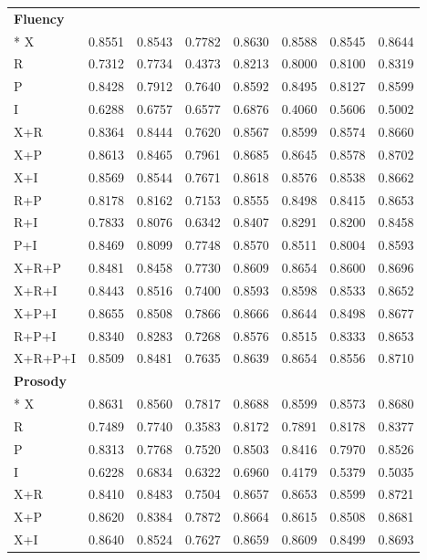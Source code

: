 \documentclass[10pt]{article}
\begin{document}
\begin{longtable}{@{}lrrrrrrr@{}}
\midrule
\multicolumn{8}{l}{\textbf{Fluency}}\\*\midrule
X & 0.8551 & 0.8543 & 0.7782 & 0.8630 & 0.8588 & 0.8545 & 0.8644 \\
R & 0.7312 & 0.7734 & 0.4373 & 0.8213 & 0.8000 & 0.8100 & 0.8319 \\
P & 0.8428 & 0.7912 & 0.7640 & 0.8592 & 0.8495 & 0.8127 & 0.8599 \\
I & 0.6288 & 0.6757 & 0.6577 & 0.6876 & 0.4060 & 0.5606 & 0.5002 \\
X+R & 0.8364 & 0.8444 & 0.7620 & 0.8567 & 0.8599 & 0.8574 & 0.8660 \\
X+P & 0.8613 & 0.8465 & 0.7961 & 0.8685 & 0.8645 & 0.8578 & 0.8702 \\
X+I & 0.8569 & 0.8544 & 0.7671 & 0.8618 & 0.8576 & 0.8538 & 0.8662 \\
R+P & 0.8178 & 0.8162 & 0.7153 & 0.8555 & 0.8498 & 0.8415 & 0.8653 \\
R+I & 0.7833 & 0.8076 & 0.6342 & 0.8407 & 0.8291 & 0.8200 & 0.8458 \\
P+I & 0.8469 & 0.8099 & 0.7748 & 0.8570 & 0.8511 & 0.8004 & 0.8593 \\
X+R+P & 0.8481 & 0.8458 & 0.7730 & 0.8609 & 0.8654 & 0.8600 & 0.8696 \\
X+R+I & 0.8443 & 0.8516 & 0.7400 & 0.8593 & 0.8598 & 0.8533 & 0.8652 \\
X+P+I & 0.8655 & 0.8508 & 0.7866 & 0.8666 & 0.8644 & 0.8498 & 0.8677 \\
R+P+I & 0.8340 & 0.8283 & 0.7268 & 0.8576 & 0.8515 & 0.8333 & 0.8653 \\
X+R+P+I & 0.8509 & 0.8481 & 0.7635 & 0.8639 & 0.8654 & 0.8556 & 0.8710 \\
\midrule
\multicolumn{8}{l}{\textbf{Prosody}}\\*\midrule
X & 0.8631 & 0.8560 & 0.7817 & 0.8688 & 0.8599 & 0.8573 & 0.8680 \\
R & 0.7489 & 0.7740 & 0.3583 & 0.8172 & 0.7891 & 0.8178 & 0.8377 \\
P & 0.8313 & 0.7768 & 0.7520 & 0.8503 & 0.8416 & 0.7970 & 0.8526 \\
I & 0.6228 & 0.6834 & 0.6322 & 0.6960 & 0.4179 & 0.5379 & 0.5035 \\
X+R & 0.8410 & 0.8483 & 0.7504 & 0.8657 & 0.8653 & 0.8599 & 0.8721 \\
X+P & 0.8620 & 0.8384 & 0.7872 & 0.8664 & 0.8615 & 0.8508 & 0.8681 \\
X+I & 0.8640 & 0.8524 & 0.7627 & 0.8659 & 0.8609 & 0.8499 & 0.8693 \\

\end{longtable}
\end{document}
